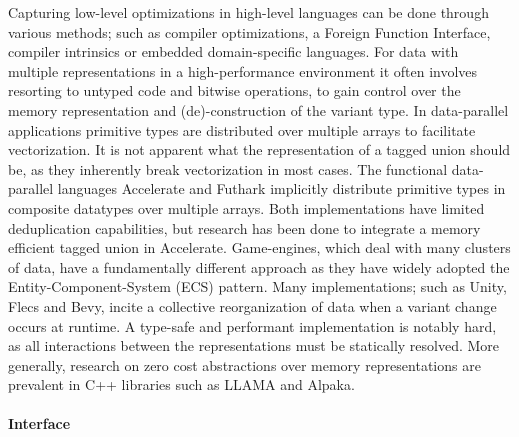 \documentclass{article}
\begin{document}
Capturing low-level optimizations in high-level languages can be done through various methods; such as compiler optimizations\cite{compiler-optimization}, a Foreign Function Interface\cite{ffi}, compiler intrinsics or embedded domain-specific languages\cite{accelerate-llvm}. 
For data with multiple representations in a high-performance environment it often involves resorting to untyped code and bitwise operations, to gain control over the memory representation and (de)-construction of the variant type.
In data-parallel applications primitive types are distributed over multiple arrays to facilitate vectorization.
It is not apparent what the representation of a tagged union should be\cite{accelerate-sum-types}, as they inherently break vectorization in most cases. 
The functional data-parallel languages Accelerate\cite{accelerate-sum-types} and Futhark\cite{futhark-sum-types} implicitly distribute primitive types in composite datatypes over multiple arrays.
Both implementations have limited deduplication capabilities, but research has been done to integrate a memory efficient tagged union in Accelerate\cite{accelerate-sum-types}.
Game-engines, which deal with many clusters of data, have a fundamentally different approach as they have widely adopted the Entity-Component-System (ECS) pattern\cite{ecs-origin}. 
Many implementations; such as Unity\cite{unity-ecs-patent}, Flecs\cite{ecs-flecs} and Bevy\cite{ecs-bevy}, incite a collective reorganization of data when a variant change occurs at runtime.
A type-safe and performant implementation is notably hard, as all interactions between the representations must be statically resolved.
More generally, research on zero cost abstractions over memory representations are prevalent in C++ libraries such as LLAMA\cite{llama} and Alpaka\cite{alpaka}. 

\paragraph{Interface}
\end{document}
